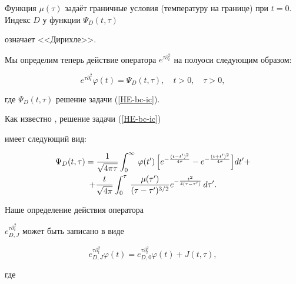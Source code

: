 Функция $\mu(\tau)$ задаёт граничные условия (температуру на границе) при $t=0$. Индекс $D$ у функции $\Psi_{D}(t,\tau)$

означает <<Дирихле>>.



Мы определим теперь действие оператора  $e^{

\tau\partial_t ^2}$ на полуоси следующим образом:

\begin{equation*}


e^{\tau\partial_t ^2}\varphi(t)= \Psi_{D}(t,\tau),\quad t>0,\quad \tau>0,

\end{equation*}

где $\Psi_{D}(t,\tau)$ решение задачи (\ref{HE-bc-ic}).



Как известно \cite{VSV-textbook}, решение задачи (\ref{HE-bc-ic})

имеет следующий вид:

\begin{multline*}

\Psi_{D}(t,\tau)=\frac{1}{\sqrt{4\pi \tau}}\int _0^\infty \,\varphi(t^\prime)\,

\Bigl[e^{-\frac{(t-t')^2}{4\tau}}-e^{-\frac{(t+t')^2}{4\tau}}\Bigr]dt' +\\

+\frac{t}{\sqrt{4\pi }}\int _0^\tau\,

\frac{\mu(\tau')}{(\tau-\tau')^{3/2}}e^{-\frac{t^2}{4(\tau-\tau')}}\,d\tau'.


\end{multline*}









Наше определение действия оператора

$e^{\tau\partial^2_t}_{D,J}$  может быть записано в виде

\begin{equation}

\label{e-D-mu}

e^{\tau\partial^2_t}_{D,J}\varphi (t)=e^{\tau\partial^2_t}_{D,0}\varphi(t)

+J(t,\tau),\end{equation}

где


